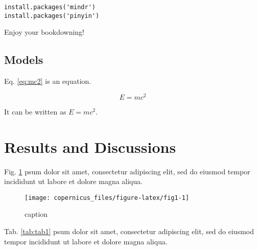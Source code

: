 \documentclass[hess, online, hvmath]{style/copernicus}
\begin{document}
\begin{verbatim}
install.packages('mindr')
install.packages('pinyin')
\end{verbatim}

Enjoy your bookdowning!

\subsection{Models}\label{models}

Eq. \eqref{eq:mc2} is an equation.

\begin{equation} 
E = mc^2
  \label{eq:mc2}
\end{equation}

It can be written as \(E = mc^2\).

\section{Results and Discussions}\label{results-and-discussions}

Fig. \ref{fig:fig1} psum dolor sit amet, consectetur adipiscing elit,
sed do eiusmod tempor incididunt ut labore et dolore magna aliqua.

\begin{figure}

{\centering \texttt{[image: copernicus\_files/figure-latex/fig1-1]} 

}

\caption{caption}\label{fig:fig1}
\end{figure}

Tab. \ref{tab:tab1} psum dolor sit amet, consectetur adipiscing elit,
sed do eiusmod tempor incididunt ut labore et dolore magna aliqua.
\end{document}
